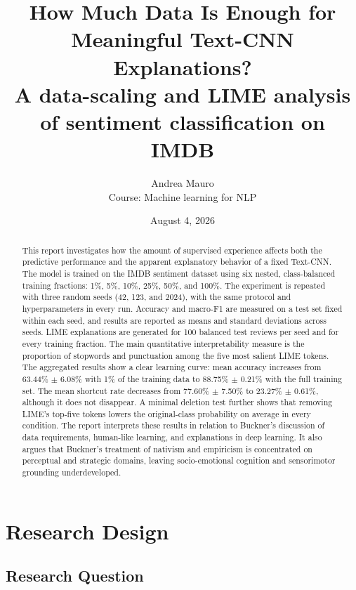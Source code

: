 \documentclass[11pt]{article}
\title{How Much Data Is Enough for Meaningful Text-CNN Explanations?\\
\large A data-scaling and LIME analysis of sentiment classification on IMDB}
\author{Andrea Mauro\\Course: Machine learning for NLP}
\date{August 4, 2026}
\begin{document}
\maketitle

\begin{abstract}
This report investigates how the amount of supervised experience affects both the predictive performance and the apparent explanatory behavior of a fixed Text-CNN. The model is trained on the IMDB sentiment dataset using six nested, class-balanced training fractions: 1\%, 5\%, 10\%, 25\%, 50\%, and 100\%. The experiment is repeated with three random seeds (42, 123, and 2024), with the same protocol and hyperparameters in every run. Accuracy and macro-F1 are measured on a test set fixed within each seed, and results are reported as means and standard deviations across seeds. LIME explanations are generated for 100 balanced test reviews per seed and for every training fraction. The main quantitative interpretability measure is the proportion of stopwords and punctuation among the five most salient LIME tokens. The aggregated results show a clear learning curve: mean accuracy increases from 63.44\% $\pm$ 6.08\% with 1\% of the training data to 88.75\% $\pm$ 0.21\% with the full training set. The mean shortcut rate decreases from 77.60\% $\pm$ 7.50\% to 23.27\% $\pm$ 0.61\%, although it does not disappear. A minimal deletion test further shows that removing LIME's top-five tokens lowers the original-class probability on average in every condition. The report interprets these results in relation to Buckner's discussion of data requirements, human-like learning, and explanations in deep learning. It also argues that Buckner's treatment of nativism and empiricism is concentrated on perceptual and strategic domains, leaving socio-emotional cognition and sensorimotor grounding underdeveloped.
\end{abstract}

\tableofcontents
\newpage

\section{Research Design}
\label{sec:research-design}

\subsection{Research Question}
\end{document}
